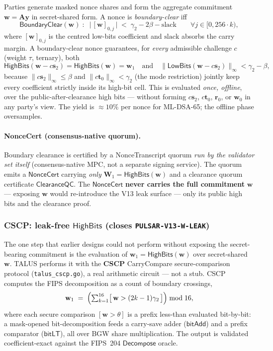 Parties generate masked nonce shares and form the aggregate commitment
$\mathbf{w} = \mathbf{A}\mathbf{y}$ in secret-shared form. A nonce is
\emph{boundary-clear} iff
\[
  \mathsf{BoundaryClear}(\mathbf{w}) \;:\;\;
  \bigl|\,[\mathbf{w}]_{0,j}\,\bigr| \;<\; \gamma_2 - 2\beta - \text{slack}
  \qquad \forall j \in [0, 256\cdot k),
\]
where $[\mathbf{w}]_{0,j}$ is the centred low-bits coefficient and
$\text{slack}$ absorbs the carry margin. A boundary-clear nonce
guarantees, for \emph{every} admissible challenge $c$ (weight $\tau$,
ternary), both
\[
  \mathsf{HighBits}(\mathbf{w} - c\mathbf{s}_2) =
  \mathsf{HighBits}(\mathbf{w}) = \mathbf{w}_1
  \quad\text{and}\quad
  \|\mathsf{LowBits}(\mathbf{w} - c\mathbf{s}_2)\|_\infty < \gamma_2 - \beta ,
\]
because $\|c\mathbf{s}_2\|_\infty \leq \beta$ and $\|c\mathbf{t}_0\|_\infty
< \gamma_2$ (the mode restriction) jointly keep every coefficient strictly
inside its high-bit cell. This is evaluated \emph{once, offline}, over the
public-after-clearance high bits --- without forming $c\mathbf{s}_2$,
$c\mathbf{t}_0$, $\mathbf{r}_0$, or $\mathbf{w}_0$ in any party's view.
The yield is $\approx 10\%$ per nonce for ML-DSA-65; the offline phase
oversamples.

\paragraph{NonceCert (consensus-native quorum).} Boundary clearance is
certified by a NonceTranscript quorum \emph{run by the validator set
itself} (consensus-native MPC, not a separate signing service). The
quorum emits a $\mathsf{NonceCert}$ carrying \emph{only} $\mathbf{W}_1 =
\mathsf{HighBits}(\mathbf{w})$ and a clearance quorum certificate
$\mathsf{ClearanceQC}$. The $\mathsf{NonceCert}$ \textbf{never carries the
full commitment} $\mathbf{w}$ --- exposing $\mathbf{w}$ would re-introduce
the V13 leak surface --- only its public high bits and the clearance
proof.

\subsubsection{CSCP: leak-free $\mathsf{HighBits}$ (closes \texttt{PULSAR-V13-W-LEAK})}
\label{sec:protocol:bcc:cscp}

The one step that earlier designs could not perform without exposing the
secret-bearing commitment is the evaluation of $\mathbf{w}_1 =
\mathsf{HighBits}(\mathbf{w})$ over secret-shared $\mathbf{w}$. TALUS
performs it with the \textbf{CSCP} CarryCompare secure-comparison protocol
(\texttt{talus\_cscp.go}), a real arithmetic circuit --- not a stub. CSCP
computes the FIPS decomposition as a count of boundary crossings,
\[
  \mathbf{w}_{1} \;=\; \Bigl(\textstyle\sum_{k=1}^{16}
  \bigl[\,\mathbf{w} > (2k-1)\gamma_2\,\bigr]\Bigr) \bmod 16,
\]
where each secure comparison $[\mathbf{w} > \theta]$ is a prefix
less-than evaluated bit-by-bit: a mask-opened bit-decomposition feeds a
carry-save adder ($\mathsf{bitAdd}$) and a prefix comparator
($\mathsf{bitLT}$), all over BGW share multiplication. The output is
validated coefficient-exact against the FIPS~204 $\mathsf{Decompose}$
oracle.

